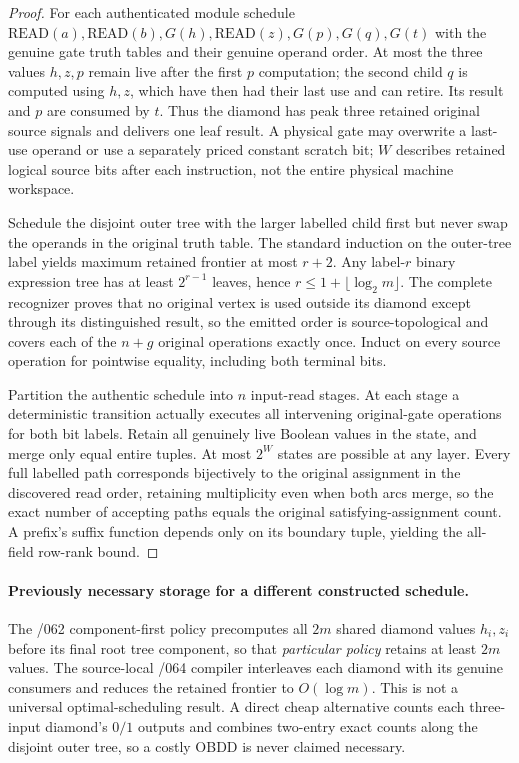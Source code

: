 \documentclass[11pt]{article}
\begin{document}
\begin{proof}
For each authenticated module schedule $\mathrm{READ}(a),\mathrm{READ}(b),G(h),\mathrm{READ}(z),G(p),G(q),G(t)$ with the genuine gate truth tables and their genuine operand order. At most the three values $h,z,p$ remain live after the first $p$ computation; the second child $q$ is computed using $h,z$, which have then had their last use and can retire. Its result and $p$ are consumed by $t$. Thus the diamond has peak three retained original source signals and delivers one leaf result. A physical gate may overwrite a last-use operand or use a separately priced constant scratch bit; $W$ describes retained logical source bits after each instruction, not the entire physical machine workspace.

Schedule the disjoint outer tree with the larger labelled child first but never swap the operands in the original truth table. The standard induction on the outer-tree label yields maximum retained frontier at most $r+2$. Any label-$r$ binary expression tree has at least $2^{r-1}$ leaves, hence $r\le1+\lfloor\log_2m\rfloor$. The complete recognizer proves that no original vertex is used outside its diamond except through its distinguished result, so the emitted order is source-topological and covers each of the $n+g$ original operations exactly once. Induct on every source operation for pointwise equality, including both terminal bits.

Partition the authentic schedule into $n$ input-read stages. At each stage a deterministic transition actually executes all intervening original-gate operations for both bit labels. Retain all genuinely live Boolean values in the state, and merge only equal entire tuples. At most $2^W$ states are possible at any layer. Every full labelled path corresponds bijectively to the original assignment in the discovered read order, retaining multiplicity even when both arcs merge, so the exact number of accepting paths equals the original satisfying-assignment count. A prefix's suffix function depends only on its boundary tuple, yielding the all-field row-rank bound.
\end{proof}

\paragraph{Previously necessary storage for a different constructed schedule.}
The /062 component-first policy precomputes all $2m$ shared diamond values $h_i,z_i$ before its final root tree component, so that \emph{particular policy} retains at least $2m$ values. The source-local /064 compiler interleaves each diamond with its genuine consumers and reduces the retained frontier to $O(\log m)$. This is not a universal optimal-scheduling result. A direct cheap alternative counts each three-input diamond's $0/1$ outputs and combines two-entry exact counts along the disjoint outer tree, so a costly OBDD is never claimed necessary.
\end{document}
